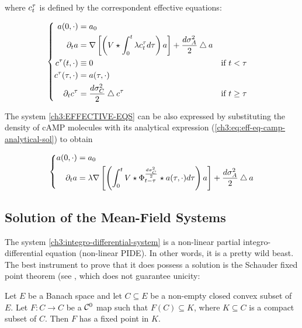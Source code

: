 where $c_t^\tau$ is defined by the correspondent effective equations:

\begin{equation}\label{ch3:EFFECTIVE-EQS}
\left\{
\begin{aligned}
a(0, \cdot) &= a_0
\\
\partial_t a &= \nabla \left[ \left( V
				\star \int_0^t \lambda c_t^\tau 	d \tau
			\right)
			a
			\right]
	+ \frac{d\sigma_A^2}{2} \bigtriangleup a	
\\
c^\tau(t, \cdot) 
& \equiv 0
&&\text{if } t < \tau
\\
c^\tau(\tau, \cdot) 
&= a(\tau, \cdot)
&&
\\
\partial_t c^\tau
&= \frac{d\sigma_C^2}{2} \bigtriangleup c^\tau
&&\text{if } t \geq \tau
\end{aligned}
\right.
\end{equation}

The system \ref{ch3:EFFECTIVE-EQS} can be also expressed by substituting the density of cAMP molecules with its analytical expression (\ref{ch3:eq:eff-eq-camp-analytical-sol}) to obtain

\begin{equation}\label{ch3:integro-differential-system}
\left\{
\begin{aligned}
a(0, \cdot) &= a_0
\\
\partial_t a &=  \lambda \nabla \left[ \left( \int_0^t
		V \star \Phi_{t-\tau}^{\frac{d\sigma_C^2}{2}} \star a(\tau, \cdot) 
	 	d \tau
			\right)
			a
			\right]
	+ \frac{d\sigma_A^2}{2} \bigtriangleup a
\end{aligned}
\right.
\end{equation}


\subsection{Solution of the Mean-Field Systems}\label{ch3:prove-solutions?}

The system \ref{ch3:integro-differential-system} is a non-linear partial integro-differential equation (non-linear PIDE).
In other words, it is a pretty wild beast.
The best instrument to prove that it does possess a solution is the Schauder fixed point theorem (see \autocite[Exercise 6.26]{brezis}, which does not guarantee unicity:

\begin{theorem}\label{ch3:fixed-point-schauder-theorem}
Let $E$ be a Banach space and let $C \subseteq E$ be a non-empty closed convex subset of $E$.
Let $F: C \longrightarrow C$ be a $\mathcal{C}^0$ map such that $F(C) \subseteq K$, where $K\subseteq C$ is a compact subset of $C$.
Then $F$ has a fixed point in $K$.
\end{theorem}

